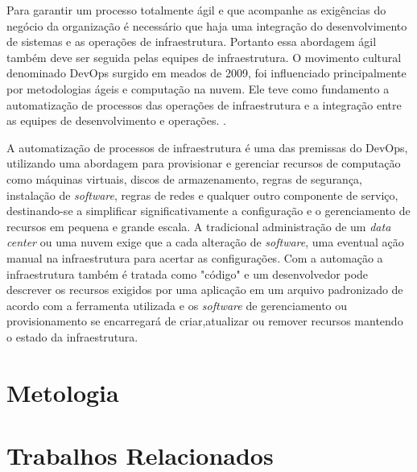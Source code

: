 Para garantir um processo totalmente ágil e que acompanhe as exigências do negócio da organização é necessário que haja uma integração do desenvolvimento de sistemas e as operações de infraestrutura. Portanto essa abordagem ágil também deve ser seguida pelas equipes de infraestrutura.
O movimento cultural denominado DevOps surgido em meados de 2009, foi influenciado principalmente por metodologias ágeis e computação na nuvem. Ele teve como fundamento a automatização de processos das operações de infraestrutura e a integração entre as equipes de desenvolvimento e operações. \cite{sato}.

A automatização de processos de infraestrutura é uma das premissas do DevOps, utilizando uma abordagem para provisionar e gerenciar recursos de computação como máquinas virtuais, discos de armazenamento, regras de segurança, instalação de \textit{software}, regras de redes e qualquer outro componente de serviço, destinando-se a simplificar significativamente a configuração e o gerenciamento de recursos em pequena e grande escala. A tradicional administração de um \textit{data center} ou uma nuvem exige que a cada alteração de \textit{software}, uma eventual ação manual na infraestrutura para acertar as configurações. Com a automação a infraestrutura também é tratada como "código" e um desenvolvedor pode descrever os recursos exigidos por uma aplicação em um arquivo padronizado de acordo com a ferramenta utilizada e os \textit{software} de gerenciamento ou provisionamento se encarregará de criar,atualizar ou remover recursos mantendo o estado da infraestrutura. 

\section{\esp Metologia}


\section{\esp Trabalhos Relacionados}


